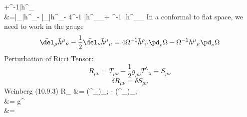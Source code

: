 \documentclass[10pt,letterpaper]{article}
\begin{document}
	+\Omega^{-1}\bar h^{\mu}{}_\rho \plr{ \delta^\rho_\nu \pd_\mu\Omega + \delta^\rho_\mu \pd_\nu\Omega - \eta^{\rho\alpha}\eta_{\mu\nu}\pd_\alpha\Omega}\\
	&=\bar \del_\mu \bar h^\mu{}_\nu -  \bar \del_\nu \bar h^\mu{}_\mu - 4\Omega^{-1} \bar h^\rho{}_\nu  \pd_\rho \Omega + \Omega^{-1} \bar h^\mu{}_\mu \pd_\nu \Omega
\ea
In a conformal to flat space, we need to work in the gauge 
\[
	 \bar \del_\mu \bar h^\mu{}_\nu - \frac12 \bar \del_\nu \bar h^\mu{}_\mu = 4\Omega^{-1} \bar h^\rho{}_\nu  \pd_\rho \Omega - \Omega^{-1} h^\mu{}_\mu \pd_\nu \Omega
\]
Perturbation of Ricci Tensor:
\[
	R_{\mu\nu} = T_{\mu\nu} -\frac12g_{\mu\nu}T^\lambda{}_\lambda \equiv S_{\mu\nu}
\]
\[
	\delta R_{\mu\nu} = \delta S_{\mu\nu}
\]
Weinberg (10.9.3)
\ba
	\delta R_{\mu\nu} &= (\delta \Gamma^{\lambda}_{\mu\lambda})_{;\nu} - (\delta \Gamma^{\lambda}_{\mu\nu})_{;\lambda}\\
	&=  g^{\lambda\rho}\\
	&=  
\ea
\end{document}
